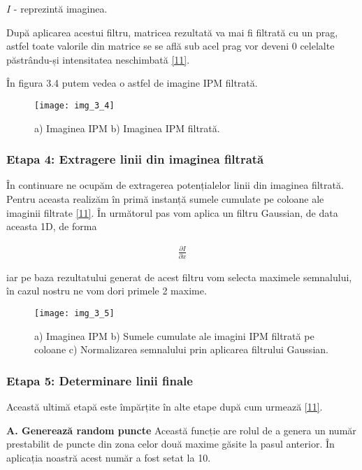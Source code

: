 $I$ - reprezintă imaginea.

După aplicarea acestui filtru, matricea rezultată va mai fi filtrată cu un prag, astfel toate valorile din matrice se se află sub acel prag vor deveni 0 celelalte păstrându-și intensitatea neschimbată \hyperlink{WaymoSystem}{[11]}.

În figura 3.4 putem vedea o astfel de imagine IPM filtrată.
\begin{figure}[!h]
	\centering
	\texttt{[image: img\_3\_4]}
	\caption[Imagine IPM filtrată]{a) Imaginea IPM b) Imaginea IPM filtrată.}
\end{figure}

\subsubsection*{Etapa 4: Extragere linii din imaginea filtrată}

În continuare ne ocupăm de extragerea potențialelor linii din imaginea filtrată. Pentru aceasta realizăm în primă instanță sumele cumulate pe coloane ale imaginii filtrate \hyperlink{WaymoSystem}{[11]}. În următorul pas vom aplica un filtru Gaussian, de data aceasta 1D, de forma

\begin{align}
	\frac{\partial I}{\partial x}
\end{align}

iar pe baza rezultatului generat de acest filtru vom selecta maximele semnalului, în cazul nostru ne vom dori primele 2 maxime.

\begin{figure}[!h]
	\centering
	\texttt{[image: img\_3\_5]}
	\caption[Linii din semnal]{a) Imaginea IPM b) Sumele cumulate ale imagini IPM filtrată pe coloane c) Normalizarea semnalului prin aplicarea filtrului Gaussian.}
\end{figure}

\subsubsection*{Etapa 5: Determinare linii finale}

Această ultimă etapă este împărțite în alte etape după cum urmează \hyperlink{WaymoSystem}{[11]}.

\textbf{A. Generează random puncte}
Această funcție are rolul de a genera un număr prestabilit de puncte din zona celor două maxime găsite la pasul anterior. În aplicația noastră acest număr a fost setat la 10.

